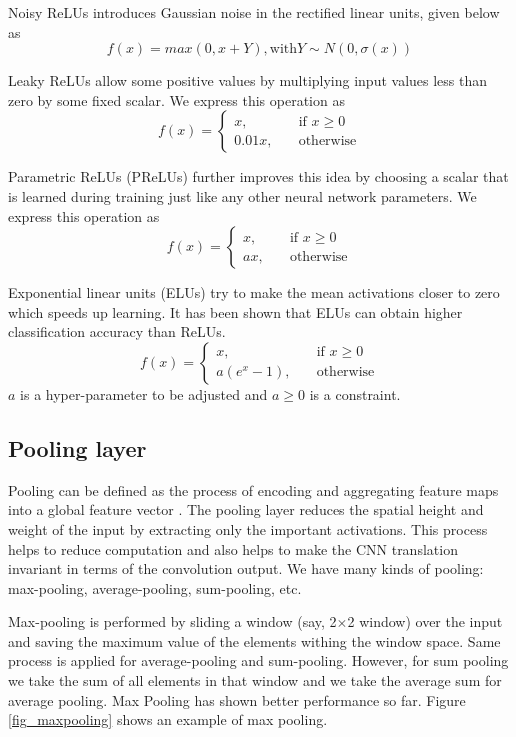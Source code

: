 \documentclass[master]{thesis-uestc}
\begin{document}
Noisy ReLUs introduces Gaussian noise in the rectified linear units, given below as
\[ f(x) = max(0, x + Y), \text{with} Y \sim N(0, \sigma(x))\]

Leaky ReLUs allow some positive values by multiplying input values less than zero by some fixed scalar. We express this operation as
\[ f(x) =
  \begin{cases}
    x, & \quad  \text{if } x \geq 0\\
    0.01x, & \quad \text{otherwise}
  \end{cases}
\]

Parametric ReLUs (PReLUs) further improves this idea by choosing a scalar that is learned during training just like any other neural network parameters. We express this operation as
\[ f(x) =
  \begin{cases}
    x, & \quad  \text{if } x \geq 0\\
    ax, & \quad \text{otherwise}
  \end{cases}
\]

Exponential linear units (ELUs) try to make the mean activations closer to zero which speeds up learning. It has been shown that ELUs can obtain higher classification accuracy than ReLUs.
\[ f(x) =
  \begin{cases}
    x, & \quad  \text{if } x \geq 0\\
    a(e^x - 1), & \quad \text{otherwise}
  \end{cases}
\]
$a$ is a hyper-parameter to be adjusted and $a \geq 0$ is a constraint.

\subsection{Pooling layer}
Pooling can be defined as the process of encoding and aggregating feature maps into a global feature vector . The pooling layer reduces the spatial height and weight of the input by extracting only the important activations. This process helps to reduce computation and also helps to make the CNN translation invariant in terms of the convolution output. We have many kinds of pooling: max-pooling, average-pooling, sum-pooling, etc.

Max-pooling is performed by sliding a window (say, 2$\times$2 window) over the input and saving the maximum value of the elements withing the window space. Same process is applied for average-pooling and sum-pooling. However, for sum pooling we take the sum of all elements in that window and we take the average sum for average pooling. Max Pooling has shown better performance so far. Figure \ref{fig_maxpooling} shows an example of max pooling.
\end{document}
